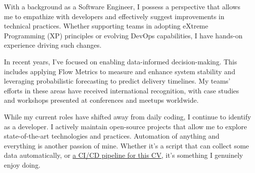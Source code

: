 \begin{cvparagraph}
{	With a background as a Software Engineer, I possess a perspective that allows me to empathize with developers and effectively suggest improvements in technical practices. Whether supporting teams in adopting eXtreme Programming (XP) principles or evolving DevOps capabilities, I have hands-on experience driving such changes.
	
	In recent years, I’ve focused on enabling data-informed decision-making. This includes applying Flow Metrics to measure and enhance system stability and leveraging probabilistic forecasting to predict delivery timelines. My teams' efforts in these areas have received international recognition, with case studies and workshops presented at conferences and meetups worldwide.
	
	While my current roles have shifted away from daily coding, I continue to identify as a developer. I actively maintain open-source projects that allow me to explore state-of-the-art technologies and practices. Automation of anything and everything is another passion of mine. Whether it's a script that can collect some data automatically, or \underline{\href{https://github.com/huserben/cv/actions}{a CI/CD pipeline for this CV}}, it's something I genuinely enjoy doing.
}
\end{cvparagraph}
